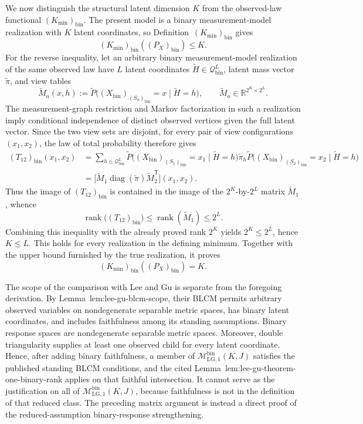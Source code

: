 We now distinguish the structural latent dimension \(K\) from the
observed-law functional \((K_{\min})_{\mathrm{bin}}\).  The present model is
a binary measurement-model realization with \(K\) latent coordinates, so
Definition~\textnormal{\((K_{\min})_{\mathrm{bin}}\)} gives
\[
 (K_{\min})_{\mathrm{bin}}((P_X)_{\mathrm{bin}})\leq K.
\]
For the reverse inequality, let an arbitrary binary measurement-model
realization of the same observed law have \(L\) latent coordinates
\(\widetilde H\in\mathcal Q_{\mathrm{bin}}^L\), latent mass vector
\(\widetilde\pi\), and view tables
\[
 \widetilde M_a(x,h)
 :=\widetilde P\bigl((X_{\mathrm{bin}})_{(S_a)_{\mathrm{bin}}}=x
          \mid \widetilde H=h\bigr),
 \qquad
 \widetilde M_a\in\mathbb R^{2^K\times 2^L}.
\]
The measurement-graph restriction and Markov factorization in such a
realization imply conditional independence of distinct observed vertices
given the full latent vector.  Since the two view sets are disjoint, for
every pair of view configurations \((x_1,x_2)\), the law of total probability
therefore gives
\[
 \begin{aligned}
 (T_{12})_{\mathrm{bin}}(x_1,x_2)
 &=\sum_{h\in\mathcal Q_{\mathrm{bin}}^L}
   \widetilde P\bigl((X_{\mathrm{bin}})_{(S_1)_{\mathrm{bin}}}=x_1
                   \mid\widetilde H=h\bigr)
   \widetilde\pi_h
   \widetilde P\bigl((X_{\mathrm{bin}})_{(S_2)_{\mathrm{bin}}}=x_2
                   \mid\widetilde H=h\bigr) \\
 &=\bigl[\widetilde M_1\operatorname{diag}(\widetilde\pi)
          \widetilde M_2^{\mathsf T}\bigr](x_1,x_2).
 \end{aligned}
\]
Thus the image of \((T_{12})_{\mathrm{bin}}\) is contained in the image of
the \(2^K\)-by-\(2^L\) matrix \(\widetilde M_1\), whence
\[
 \operatorname{rank}\bigl((T_{12})_{\mathrm{bin}}\bigr)
 \leq\operatorname{rank}(\widetilde M_1)\leq 2^L.
\]
Combining this inequality with the already proved rank \(2^K\) yields
\(2^K\leq2^L\), hence \(K\leq L\).  This holds for every realization in
the defining minimum.  Together with the upper bound furnished by the true
realization, it proves
\[
 (K_{\min})_{\mathrm{bin}}((P_X)_{\mathrm{bin}})=K.
\]

The scope of the comparison with Lee and Gu is separate from the foregoing
derivation.  By Lemma~\textnormal{lem:lee-gu-blcm-scope}, their BLCM permits
arbitrary observed variables on nondegenerate separable metric spaces, has
binary latent coordinates, and includes faithfulness among its standing
assumptions.  Binary response spaces are nondegenerate separable metric
spaces.  Moreover, double triangularity supplies at least one observed child
for every latent coordinate.  Hence, after adding binary faithfulness, a
member of \(\mathcal M_{\mathrm{LG},1}^{\mathrm{bin}}(K,J)\) satisfies the
published standing BLCM conditions, and the cited
Lemma~\textnormal{lem:lee-gu-theorem-one-binary-rank} applies on that faithful
intersection.  It cannot serve as the justification on all of
\(\mathcal M_{\mathrm{LG},1}^{\mathrm{bin}}(K,J)\), because faithfulness is
not in the definition of that reduced class.  The preceding matrix argument
is instead a direct proof of the reduced-assumption binary-response
strengthening.

